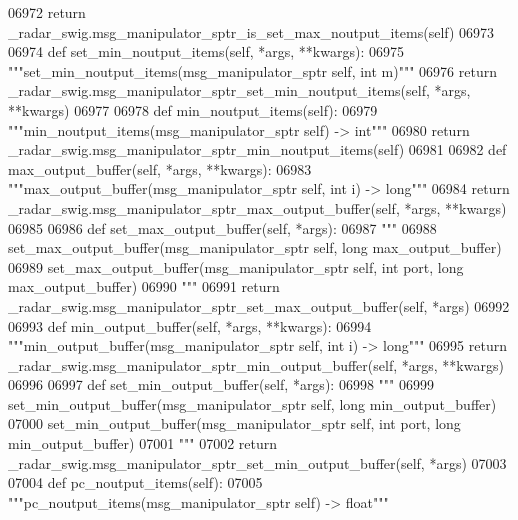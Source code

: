\begin{DoxyCode}
{{{{{{{{{{{{{{{{{{{{{{{06972         \textcolor{keywordflow}{return} \_radar\_swig.msg\_manipulator\_sptr\_is\_set\_max\_noutput\_items(self)
06973 
06974     \textcolor{keyword}{def }set_min_noutput_items(self, *args, **kwargs):
06975         \textcolor{stringliteral}{"""set\_min\_noutput\_items(msg\_manipulator\_sptr self, int m)"""}
06976         \textcolor{keywordflow}{return} \_radar\_swig.msg\_manipulator\_sptr\_set\_min\_noutput\_items(self, *args, **kwargs)
06977 
06978     \textcolor{keyword}{def }min_noutput_items(self):
06979         \textcolor{stringliteral}{"""min\_noutput\_items(msg\_manipulator\_sptr self) -> int"""}
06980         \textcolor{keywordflow}{return} \_radar\_swig.msg\_manipulator\_sptr\_min\_noutput\_items(self)
06981 
06982     \textcolor{keyword}{def }max_output_buffer(self, *args, **kwargs):
06983         \textcolor{stringliteral}{"""max\_output\_buffer(msg\_manipulator\_sptr self, int i) -> long"""}
06984         \textcolor{keywordflow}{return} \_radar\_swig.msg\_manipulator\_sptr\_max\_output\_buffer(self, *args, **kwargs)
06985 
06986     \textcolor{keyword}{def }set_max_output_buffer(self, *args):
06987         \textcolor{stringliteral}{"""}
06988 \textcolor{stringliteral}{        set\_max\_output\_buffer(msg\_manipulator\_sptr self, long max\_output\_buffer)}
06989 \textcolor{stringliteral}{        set\_max\_output\_buffer(msg\_manipulator\_sptr self, int port, long max\_output\_buffer)}
06990 \textcolor{stringliteral}{        """}
06991         \textcolor{keywordflow}{return} \_radar\_swig.msg\_manipulator\_sptr\_set\_max\_output\_buffer(self, *args)
06992 
06993     \textcolor{keyword}{def }min_output_buffer(self, *args, **kwargs):
06994         \textcolor{stringliteral}{"""min\_output\_buffer(msg\_manipulator\_sptr self, int i) -> long"""}
06995         \textcolor{keywordflow}{return} \_radar\_swig.msg\_manipulator\_sptr\_min\_output\_buffer(self, *args, **kwargs)
06996 
06997     \textcolor{keyword}{def }set_min_output_buffer(self, *args):
06998         \textcolor{stringliteral}{"""}
06999 \textcolor{stringliteral}{        set\_min\_output\_buffer(msg\_manipulator\_sptr self, long min\_output\_buffer)}
07000 \textcolor{stringliteral}{        set\_min\_output\_buffer(msg\_manipulator\_sptr self, int port, long min\_output\_buffer)}
07001 \textcolor{stringliteral}{        """}
07002         \textcolor{keywordflow}{return} \_radar\_swig.msg\_manipulator\_sptr\_set\_min\_output\_buffer(self, *args)
07003 
07004     \textcolor{keyword}{def }pc_noutput_items(self):
07005         \textcolor{stringliteral}{"""pc\_noutput\_items(msg\_manipulator\_sptr self) -> float"""}
}}}}}}}}}}}}}}}}}}}}}}}
\end{DoxyCode}
